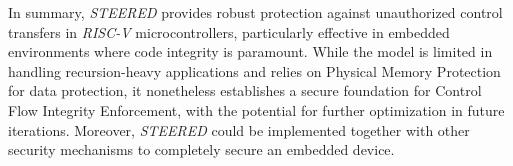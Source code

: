 In summary, \textit{STEERED} provides robust protection against unauthorized control
transfers in \textit{RISC-V} microcontrollers, particularly effective in embedded
environments where code integrity is paramount. While the model is limited in
handling recursion-heavy applications and relies on Physical Memory Protection
for data protection, it nonetheless establishes a secure foundation for Control Flow
Integrity Enforcement, with the potential for further optimization in future
iterations. Moreover, \textit{STEERED} could be implemented together with other security
mechanisms to completely secure an embedded device.